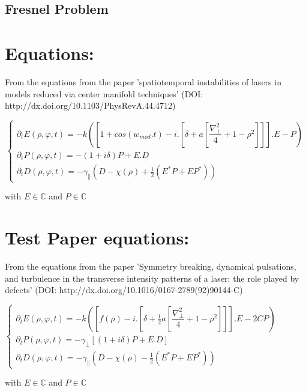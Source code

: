 \documentclass[a4paper,11pt,spanish,sans]{exam}
\begin{document}
\begin{center}
\section*{Fresnel Problem}
\end{center}

\section*{Equations:} 


From the equations from the paper 'spatiotemporal instabilities of lasers in models reduced via center manifold techniques' (DOI: http://dx.doi.org/10.1103/PhysRevA.44.4712)

\[
\begin{cases}
\partial_t E(\rho,\varphi,t)=-k\left([1+cos(w_{mod}.t)-i.\left[\delta+a\left[\dfrac{\nabla^2_{\bot}}{4}+1-\rho^2\right]\right]].E-P\right)\\
\partial_t P(\rho,\varphi,t)=-(1+i\delta)P+E.D\\
\partial_t D(\rho,\varphi,t)=-\gamma_{\parallel}(D-\chi(\rho)+\frac{1}{2}(E^*P+EP^*))
\end{cases}
\]

with $E \in \mathbb{C}$ and $P \in \mathbb{C}$

\section{Test Paper equations:}

From the equations from the paper 'Symmetry breaking, dynamical pulsations, and turbulence in the transverse intensity patterns of a laser: the role played by defects' (DOI: http://dx.doi.org/10.1016/0167-2789(92)90144-C)

$\begin{cases}
\partial_t E(\rho,\varphi,t)=-k\left([f(\rho)-i.\left[\delta+\frac{1}{2}a\left[\dfrac{\nabla^2_{\bot}}{4}+1-\rho^2\right]\right]].E-2CP\right)\\
\partial_t P(\rho,\varphi,t)=-\gamma_{\bot}[(1+i\delta)P+E.D]\\
\partial_t D(\rho,\varphi,t)=-\gamma_{\parallel}(D-\chi(\rho)-\frac{1}{2}(E^*P+EP^*))
\end{cases}$


with $E \in \mathbb{C}$ and $P \in \mathbb{C}$
\end{document}
